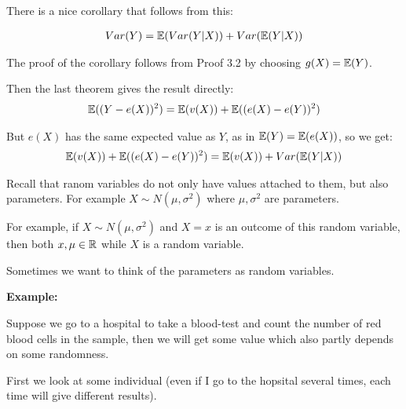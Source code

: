 \par\bigskip
\noindent There is a nice corollary  that follows from this:
\par\bigskip
\begin{theo}[]{}
  \begin{equation*}
    \begin{gathered}
      Var(Y) = \mathbb{E}(Var(Y|X)) + Var(\mathbb{E}(Y|X))
    \end{gathered}
  \end{equation*}
\end{theo}
\par\bigskip
\noindent The proof of the corollary follows from Proof 3.2 by choosing $g(X) = \mathbb{E}(Y)$.\par
\noindent Then the last theorem gives the result directly:
\begin{equation*}
  \begin{gathered}
    \mathbb{E}((Y-e(X))^2) = \mathbb{E}(v(X))+\mathbb{E}((e(X)-e(Y))^2)
  \end{gathered}
\end{equation*}\par
\noindent But $e(X)$ has the same expected value as $Y$, as in $\mathbb{E}(Y) = \mathbb{E}(e(X))$, so we get:
\begin{equation*}
  \begin{gathered}
    \mathbb{E}(v(X))+\mathbb{E}((e(X)-e(Y))^2) = \mathbb{E}(v(X))+Var(\mathbb{E}(Y|X))
  \end{gathered}
\end{equation*}
\par\bigskip
\noindent Recall that ranom variables do not only have values attached to them, but also parameters. For example $X\sim N(\mu,\sigma^2)$ where $\mu,\sigma^2$ are parameters.
\par\bigskip
\noindent For example, if $X\sim N(\mu,\sigma^2)$ and $X =x$ is an outcome of this random variable, then both $x,\mu\in\mathbb{R}$ while $X$ is a random variable.
\par\bigskip
\noindent Sometimes we want to think of the parameters as random variables.
\par\bigskip
\noindent\textbf{Example:}\par
\noindent Suppose we go to a hospital to take a blood-test and count the number of red blood cells in the sample, then we will get some value which also partly depends on some randomness.\par
\noindent First we look at some individual (even if I go to the hopsital several times, each time will give different results).
\par\bigskip
